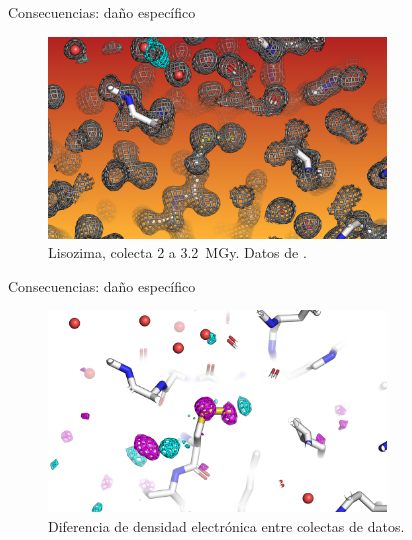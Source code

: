 \documentclass{beamer}
\begin{document}
\begin{frame}{Consecuencias: daño específico}
 \begin{figure}[h]
  \centering
  \includegraphics[width=0.8\textwidth]{after.png}
  \caption{Lisozima, colecta 2 a \SI{3.2}{\mega\gray}. Datos de \cite{Nanao2005}.}
 \end{figure}
\end{frame}
\begin{frame}{Consecuencias: daño específico}
 \begin{figure}[h]
  \centering
  \includegraphics[width=0.8\textwidth]{diff.png}
  \caption{Diferencia de densidad electrónica entre colectas de datos. }
  \label{fig:nanao2005}
 \end{figure}
\end{frame}
\end{document}
